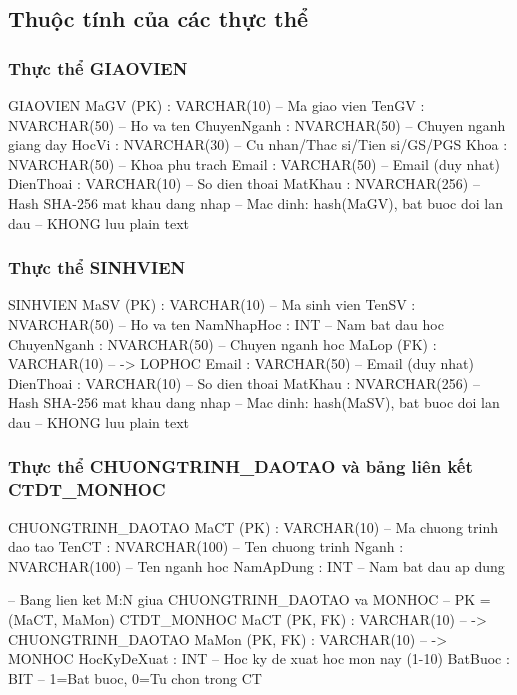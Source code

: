 \documentclass[13pt, a4paper]{article}
\begin{document}
\subsection{Thuộc tính của các thực thể}

\subsubsection{Thực thể GIAOVIEN}
\begin{sqlbox}
GIAOVIEN {
   MaGV (PK)    : VARCHAR(10)    -- Ma giao vien
   TenGV        : NVARCHAR(50)   -- Ho va ten
   ChuyenNganh  : NVARCHAR(50)   -- Chuyen nganh giang day
   HocVi        : NVARCHAR(30)   -- Cu nhan/Thac si/Tien si/GS/PGS
   Khoa         : NVARCHAR(50)   -- Khoa phu trach
   Email        : VARCHAR(50)    -- Email (duy nhat)
   DienThoai    : VARCHAR(10)    -- So dien thoai
   MatKhau      : NVARCHAR(256)  -- Hash SHA-256 mat khau dang nhap
                                 -- Mac dinh: hash(MaGV), bat buoc doi lan dau
                                 -- KHONG luu plain text
}
\end{sqlbox}

\subsubsection{Thực thể SINHVIEN}
\begin{sqlbox}
SINHVIEN {
   MaSV (PK)    : VARCHAR(10)    -- Ma sinh vien
   TenSV        : NVARCHAR(50)   -- Ho va ten
   NamNhapHoc   : INT            -- Nam bat dau hoc
   ChuyenNganh  : NVARCHAR(50)   -- Chuyen nganh hoc
   MaLop (FK)   : VARCHAR(10)    -- -> LOPHOC
   Email        : VARCHAR(50)    -- Email (duy nhat)
   DienThoai    : VARCHAR(10)    -- So dien thoai
   MatKhau      : NVARCHAR(256)  -- Hash SHA-256 mat khau dang nhap
                                 -- Mac dinh: hash(MaSV), bat buoc doi lan dau
                                 -- KHONG luu plain text
}
\end{sqlbox}

\subsubsection{Thực thể CHUONGTRINH\_DAOTAO và bảng liên kết CTDT\_MONHOC}
\begin{sqlbox}
CHUONGTRINH_DAOTAO {
   MaCT (PK)      : VARCHAR(10)    -- Ma chuong trinh dao tao
   TenCT          : NVARCHAR(100)  -- Ten chuong trinh
   Nganh          : NVARCHAR(100)  -- Ten nganh hoc
   NamApDung      : INT            -- Nam bat dau ap dung
}

-- Bang lien ket M:N giua CHUONGTRINH_DAOTAO va MONHOC
-- PK = (MaCT, MaMon)
CTDT_MONHOC {
   MaCT (PK, FK)    : VARCHAR(10)  -- -> CHUONGTRINH_DAOTAO
   MaMon (PK, FK)   : VARCHAR(10)  -- -> MONHOC
   HocKyDeXuat      : INT          -- Hoc ky de xuat hoc mon nay (1-10)
   BatBuoc          : BIT          -- 1=Bat buoc, 0=Tu chon trong CT
}
\end{sqlbox}
\end{document}
